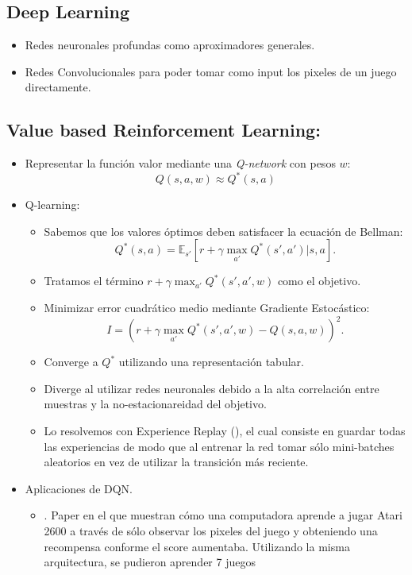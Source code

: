 \documentclass[11pt]{article}
\theoremstyle{plain}
\begin{document}
\subsection{Deep Learning}
	\begin{itemize}
		\item Redes neuronales profundas como aproximadores generales.
		\item Redes Convolucionales para poder tomar como input los pixeles de un juego directamente.
	\end{itemize}
\subsection{Value based Reinforcement Learning:}
	\begin{itemize}
	   \item Representar la función valor mediante una \textit{Q-network} con pesos $w$:
	   \[Q(s,a,w) \approx Q^\ast(s,a) \]
	   \item Q-learning:
        \begin{itemize}	  
        	\item  Sabemos que los valores óptimos deben satisfacer la ecuación de Bellman:
        	\[ Q^\ast(s,a)=\mathbb{E}_{s'}[r + \gamma \max_{a'} Q^\ast(s',a')|s,a]. \]
        	\item Tratamos el término $r + \gamma \max_{a'} Q^\ast(s',a',w)$ como el objetivo.
        	\item Minimizar error cuadrático medio mediante Gradiente Estocástico:
        	\[ I = (r + \gamma \max_{a'} Q^\ast(s',a',w) - Q(s,a,w))^2. \]
        	\item Converge a $Q^\ast$ utilizando una representación tabular.
        	\item Diverge al utilizar redes neuronales debido a la alta correlación entre muestras y la no-estacionareidad del objetivo.
        	\item Lo resolvemos con Experience Replay (\cite{Lin1992}),  el cual consiste en guardar todas las experiencias de modo que al entrenar la red tomar sólo mini-batches aleatorios  en vez de utilizar la transición más reciente.
	    \end{itemize}
	\item Aplicaciones de DQN.
		\begin{itemize}
			\item \cite{mnih2013playing}. Paper en el que muestran cómo una computadora aprende a jugar Atari 2600 a través de sólo observar los pixeles del juego y obteniendo una 																		recompensa conforme el score aumentaba. Utilizando la misma arquitectura, se pudieron aprender 7 juegos

\end{itemize}
\end{itemize}
\end{document}
